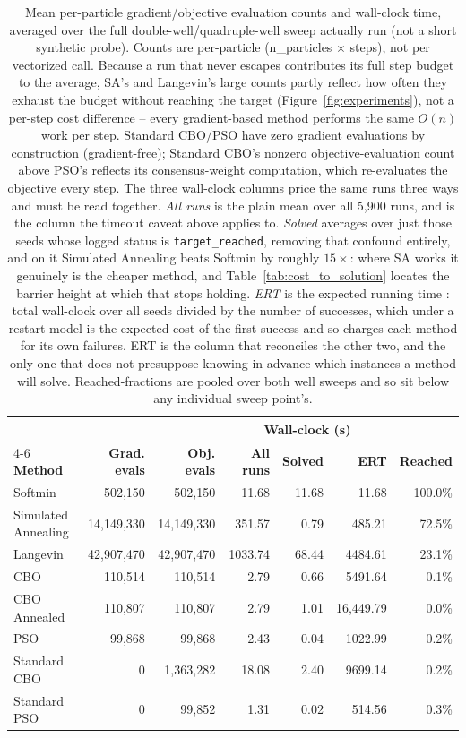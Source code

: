\documentclass{article} %
\theoremstyle{plain}
\theoremstyle{definition}
\theoremstyle{remark}
\begin{document}
\begin{table}[H]
\centering
\caption{Mean per-particle gradient/objective evaluation counts and wall-clock time, averaged over the full double-well/quadruple-well sweep actually run (not a short synthetic probe). Counts are per-particle (n\_particles $\times$ steps), not per vectorized call. Because a run that never escapes contributes its full step budget to the average, SA's and Langevin's large counts partly reflect how often they exhaust the budget without reaching the target (Figure~\ref{fig:experiments}), not a per-step cost difference -- every gradient-based method performs the same $O(n)$ work per step. Standard CBO/PSO have zero gradient evaluations by construction (gradient-free); Standard CBO's nonzero objective-evaluation count above PSO's reflects its consensus-weight computation, which re-evaluates the objective every step. The three wall-clock columns price the same runs three ways and must be read together. \emph{All runs} is the plain mean over all 5{,}900 runs, and is the column the timeout caveat above applies to. \emph{Solved} averages over just those seeds whose logged status is \texttt{target\_reached}, removing that confound entirely, and on it Simulated Annealing beats Softmin by roughly $15\times$: where SA works it genuinely is the cheaper method, and Table~\ref{tab:cost_to_solution} locates the barrier height at which that stops holding. \emph{ERT} is the expected running time \citep{hansen2016coco}: total wall-clock over all seeds divided by the number of successes, which under a restart model is the expected cost of the first success and so charges each method for its own failures. ERT is the column that reconciles the other two, and the only one that does not presuppose knowing in advance which instances a method will solve. Reached-fractions are pooled over both well sweeps and so sit below any individual sweep point's.}
\label{tab:cost_comparison}
\small
\begin{tabular}{@{}lrrrrrr@{}}
\toprule
& & & \multicolumn{3}{c}{\textbf{Wall-clock (s)}} & \\
\cmidrule(lr){4-6}
\textbf{Method} & \textbf{Grad. evals} & \textbf{Obj. evals} & \textbf{All runs} & \textbf{Solved} & \textbf{ERT} & \textbf{Reached} \\
\midrule
Softmin & 502{,}150 & 502{,}150 & 11.68 & 11.68 & 11.68 & 100.0\% \\
Simulated Annealing & 14{,}149{,}330 & 14{,}149{,}330 & 351.57 & 0.79 & 485.21 & 72.5\% \\
Langevin & 42{,}907{,}470 & 42{,}907{,}470 & 1033.74 & 68.44 & 4484.61 & 23.1\% \\
CBO & 110{,}514 & 110{,}514 & 2.79 & 0.66 & 5491.64 & 0.1\% \\
CBO Annealed & 110{,}807 & 110{,}807 & 2.79 & 1.01 & 16{,}449.79 & 0.0\% \\
PSO & 99{,}868 & 99{,}868 & 2.43 & 0.04 & 1022.99 & 0.2\% \\
Standard CBO & 0 & 1{,}363{,}282 & 18.08 & 2.40 & 9699.14 & 0.2\% \\
Standard PSO & 0 & 99{,}852 & 1.31 & 0.02 & 514.56 & 0.3\% \\
\bottomrule
\end{tabular}
\end{table}
\end{document}
